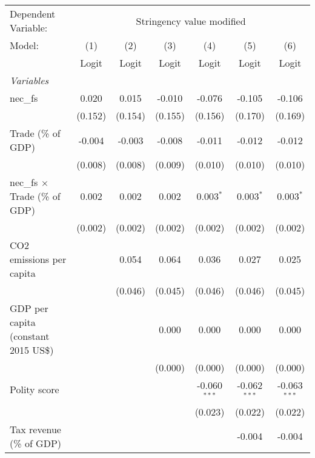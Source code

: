 
\begingroup
\centering
\begin{tabular}{lcccccc}
   \toprule
   Dependent Variable: & \multicolumn{6}{c}{Stringency value modified}\\
   Model:                                & (1)     & (2)     & (3)     & (4)            & (5)            & (6)\\  
                                         &  Logit  & Logit   & Logit   & Logit          & Logit          & Logit\\  
   \midrule
   \emph{Variables}\\
   nec\_fs                               & 0.020   & 0.015   & -0.010  & -0.076         & -0.105         & -0.106\\   
                                         & (0.152) & (0.154) & (0.155) & (0.156)        & (0.170)        & (0.169)\\   
   Trade (\% of GDP)                     & -0.004  & -0.003  & -0.008  & -0.011         & -0.012         & -0.012\\   
                                         & (0.008) & (0.008) & (0.009) & (0.010)        & (0.010)        & (0.010)\\   
   nec\_fs $\times$ Trade (\% of GDP)    & 0.002   & 0.002   & 0.002   & 0.003$^{*}$    & 0.003$^{*}$    & 0.003$^{*}$\\   
                                         & (0.002) & (0.002) & (0.002) & (0.002)        & (0.002)        & (0.002)\\   
   CO2 emissions per capita              &         & 0.054   & 0.064   & 0.036          & 0.027          & 0.025\\   
                                         &         & (0.046) & (0.045) & (0.046)        & (0.046)        & (0.045)\\   
   GDP per capita (constant 2015 US\$)   &         &         & 0.000   & 0.000          & 0.000          & 0.000\\   
                                         &         &         & (0.000) & (0.000)        & (0.000)        & (0.000)\\   
   Polity score                          &         &         &         & -0.060$^{***}$ & -0.062$^{***}$ & -0.063$^{***}$\\   
                                         &         &         &         & (0.023)        & (0.022)        & (0.022)\\   
   Tax revenue (\% of GDP)               &         &         &         &                & -0.004         & -0.004\\   

\end{tabular}
